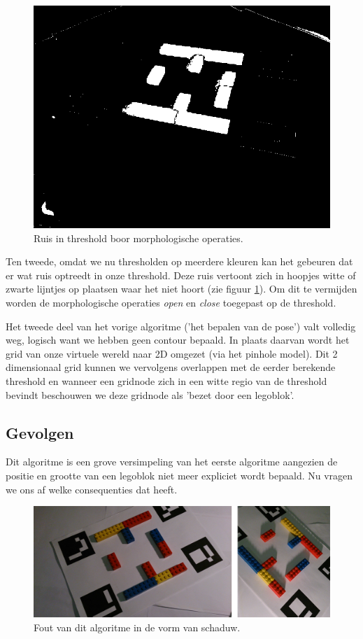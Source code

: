 \begin{figure}
  \centering
  \includegraphics[width=0.5\linewidth]{img/alg2Noise}
  \caption{Ruis in threshold boor morphologische operaties.}
  \label{fig:algo2_noise}
\end{figure}

Ten tweede, omdat we nu thresholden op meerdere kleuren kan het gebeuren dat er wat ruis optreedt in onze threshold. Deze ruis vertoont zich in hoopjes witte of zwarte lijntjes op plaatsen waar het niet hoort (zie figuur \ref{fig:algo2_noise}). Om dit te vermijden worden de morphologische operaties \textit{open} en \textit{close} toegepast op de threshold.

Het tweede deel van het vorige algoritme ('het bepalen van de pose') valt volledig weg, logisch want we hebben geen contour bepaald. In plaats daarvan wordt het grid van onze virtuele wereld naar 2D omgezet (via het pinhole model). Dit 2 dimensionaal grid kunnen we vervolgens overlappen met de eerder berekende threshold en wanneer een gridnode zich in een witte regio van de threshold bevindt beschouwen we deze gridnode als 'bezet door een legoblok'.

\subsection{Gevolgen}
Dit algoritme is een grove versimpeling van het eerste algoritme aangezien de positie en grootte van een legoblok niet meer expliciet wordt bepaald. Nu vragen we ons af welke consequenties dat heeft.

\begin{figure}
  \centering
  \includegraphics[width=\linewidth]{img/alg2Shadow}
  \caption{Fout van dit algoritme in de vorm van schaduw.}
  \label{fig:algo2_shadow}
\end{figure}

